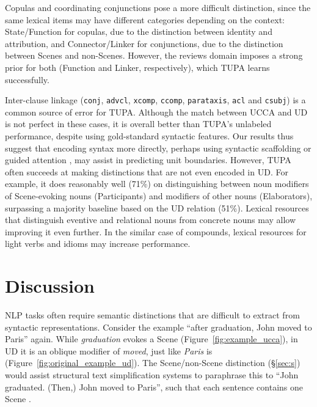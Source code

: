 \documentclass[11pt,a4paper,table]{article}
\begin{document}
Copulas and coordinating conjunctions pose a more difficult distinction,
since the same lexical items may have different categories depending on the
context: State/Function for copulas,
due to the distinction between identity and attribution, and
Connector/Linker for conjunctions,
due to the distinction between Scenes and non-Scenes.
However, the reviews domain imposes a strong prior for both (Function and Linker,
respectively), which TUPA learns successfully.

Inter-clause linkage (\texttt{conj}, \texttt{advcl}, \texttt{xcomp},
\texttt{ccomp}, \texttt{parataxis}, \texttt{acl} and \texttt{csubj})
is a common source of error for TUPA.
Although the match between UCCA and UD is not perfect in these cases,
it is overall better than TUPA's unlabeled performance,
despite using gold-standard syntactic features.
Our results thus suggest that encoding syntax more directly, perhaps using syntactic
scaffolding \citep{swayamdipta2018syntactic}
or guided attention \citep{strubell2018linguistically},
may assist in predicting unit boundaries.
However, TUPA often succeeds at making distinctions that are not even encoded in UD.
For example, it does reasonably well (71\%) on distinguishing between noun modifiers of
Scene-evoking nouns (Participants) and modifiers of other nouns (Elaborators),
surpassing a majority baseline based on the UD relation (51\%).
Lexical resources that distinguish eventive and relational nouns from concrete 
nouns may allow improving it even further.
In the similar case of compounds, lexical resources for light verbs and idioms may increase performance.


\section{Discussion}\label{sec:discussion}

NLP tasks
often require semantic distinctions that are difficult to extract from syntactic representations.
Consider the example
``after graduation, John moved to Paris'' again.
While \textit{graduation} evokes a Scene
(Figure~\ref{fig:example_ucca}), in UD it is an oblique modifier of \textit{moved},
just like \textit{Paris} is (Figure~\ref{fig:original_example_ud}).
The Scene/non-Scene distinction (\S\ref{sec:s})
would assist structural text simplification systems
to paraphrase this to
``John graduated. (Then,) John moved to Paris'',
such that each sentence contains one Scene \cite{sulem2018samsa}.
\end{document}
